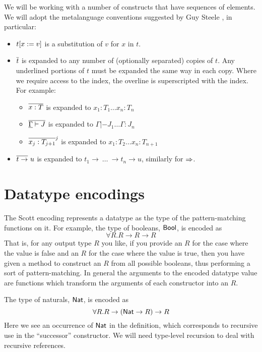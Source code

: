 We will be working with a number of constructs that have sequences of elements. We
will adopt the metalanguage conventions suggested by Guy Steele \cite{steele2017s}, in
particular:
\begin{itemize}
\item $\substIn{x}{v}{t}$ is a substitution of $v$ for $x$ in $t$.
\item $\seq{t}$ is expanded to any number of (optionally separated) copies of $t$.
  Any underlined portions of $t$ must be expanded the same way in each copy. Where we require
  access to the index, the overline is superscripted with the index. For example:
  \begin{itemize}
    \item $\seq{x : T}$ is expanded to $x_1 : T_1 \dots x_n : T_n$
    \item $\seq{\fixed{\Gamma} |- J}$ is expanded to $\Gamma |- J_1 \dots \Gamma : J_n$
    \item $\seq{x_j : T_{j+1}}^j$ is expanded to $x_1 : T_2 \dots x_n : T_{n+1}$
  \end{itemize}
\item $\seqFunArr{t}{u}$ is expanded to $t_1 \rightarrow ~\dots ~ \rightarrow
  t_n \rightarrow u$, similarly for $\kindArrow$.
\end{itemize}

\section{Datatype encodings}
\label{sec:data-encoding}

The Scott encoding represents a datatype as the type of the pattern-matching
functions on it. For example, the type of booleans, $\Bool$, is encoded as
\begin{displaymath}
  \forall R . R \rightarrow R \rightarrow R
\end{displaymath}
That is, for any output type $R$ you like, if you provide an $R$ for
the case where the value is false and an $R$ for the case where the value is
true, then you have given a method to construct an $R$ from all possible booleans,
thus performing a sort of pattern-matching. In
general the arguments to the encoded datatype value are functions which
transform the arguments of each constructor into an $R$.

The type of naturals, $\NNat$, is encoded as
\begin{displaymath}
  \forall R . R \rightarrow (\NNat \rightarrow R) \rightarrow R
\end{displaymath}
Here we see an occurrence of $\NNat$ in the definition, which
corresponds to recursive use in the ``successor'' constructor.
We will need type-level recursion to deal with recursive references.

